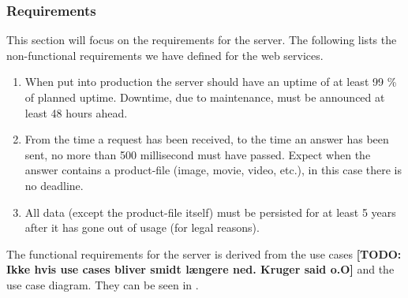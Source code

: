 \subsubsection{Requirements}
\label{s_serviceRequirements}
This section will focus on the requirements for the server. The following lists the non-functional requirements we have defined for the web services.

\begin{enumerate}[label=NFR-\arabic*]
	\item When put into production the server should have an uptime of at least 99 \% of planned uptime. Downtime, due to maintenance, must be announced at least 48 hours ahead.
	
	\item From the time a request has been received, to the time an answer has been sent, no more than 500 millisecond must have passed. Expect when the answer contains a product-file (image, movie, video, etc.), in this case there is no deadline.
	
	\item All data (except the product-file itself) must be persisted for at least 5 years after it has gone out of usage (for legal reasons).
\end{enumerate}

The functional requirements for the server is derived from the use cases \textbf{[TODO: Ikke hvis use cases bliver smidt længere ned. Kruger said o.O]} and the use case diagram. They can be seen in .



